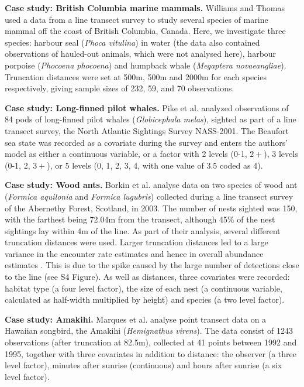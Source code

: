 \documentclass[10pt]{article}
\begin{document}
\textbf{Case study: British Columbia marine mammals.} Williams and Thomas \cite{Williams:2007tc} used a data from a line transect survey to study several species of marine mammal off the coast of British Columbia, Canada. Here, we investigate three species: harbour seal (\textit{Phoca vitulina}) in water (the data also contained observations of hauled-out animals, which were not analysed here), harbour porpoise (\textit{Phocoena phocoena}) and humpback whale (\textit{Megaptera novaeangliae}). Truncation distances were set at 500m, 500m and 2000m for each species respectively, giving sample sizes of 232, 59, and 70 observations. 

\textbf{Case study: Long-finned pilot whales.} Pike et al. \cite{Pike:2003ug} analyzed observations of 84 pods of long-finned pilot whales (\textit{Globicephala melas}), sighted as part of a line transect survey, the North Atlantic Sightings Survey NASS-2001. The Beaufort sea state was recorded as a covariate during the survey and enters the authors' model as either a continuous variable, or a factor with 2 levels (0-1, $2+$), 3 levels (0-1, 2, $3+$), or 5 levels (0, 1, 2, 3, 4, with one value of 3.5 coded as 4).
  
\textbf{Case study: Wood ants.} Borkin et al. \cite{Borkin:2012vj} analyse data on two species of wood ant (\textit{Formica aquilonia} and \textit{Formica lugubris}) collected during a line transect survey of the Abernethy Forest, Scotland, in 2003. The number of nests sighted was 150, with the farthest being 72.04m from the transect, although 45\% of the nest sightings lay within 4m of the line. As part of their analysis, several different truncation distances were used. Larger truncation distances led to a large variance in the encounter rate estimates and hence in overall abundance estimates \cite{Borkin:2012vj}. This is due to the spike caused by the large number of detections close to the line (see S4 Figure). As well as distances, three covariates were recorded: habitat type (a four level factor), the size of each nest (a continuous variable, calculated as half-width multiplied by height) and species (a two level factor).  
    
\textbf{Case study: Amakihi.} Marques et al. \cite{Marques:2007vm} analyse point transect data on a Hawaiian songbird, the Amakihi (\textit{Hemignathus virens}). The data consist of 1243 observations (after truncation at 82.5m), collected at 41 points between 1992 and 1995, together with three covariates in addition to distance: the observer (a three level factor), minutes after sunrise (continuous) and hours after sunrise (a six level factor).
\end{document}
